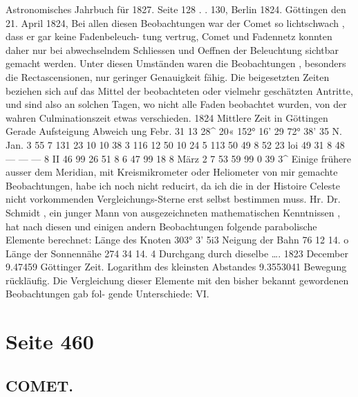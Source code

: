 \documentclass[10pt,a4paper]{article}
\begin{document}
Astronomisches  Jahrbuch  für  1827.     Seite  128  . .  130,     Berlin  1824.
Göttingen  den  21.  April  1824,
Bei  allen  diesen  Beobachtungen  war  der  Comet  so  lichtschwach ,  dass  er  gar  keine  Fadenbeleuch-
tung vertrug,  Comet  und  Fadennetz  konnten  daher  nur  bei  abwechselndem  Schliessen  und  Oeffnen  der
Beleuchtung  sichtbar  gemacht  werden.  Unter  diesen  Umständen  waren  die  Beobachtungen ,  besonders
die  Rectascensionen,  nur  geringer  Genauigkeit  fähig.  Die  beigesetzten  Zeiten  beziehen  sich  auf  das
Mittel  der  beobachteten  oder  vielmehr  geschätzten  Antritte,  und  sind  also  an  solchen  Tagen,  wo  nicht
alle  Faden  beobachtet  wurden,  von  der  wahren  Culminationszeit  etwas  verschieden.
1824
Mittlere  Zeit
in  Göttingen
Gerade
Aufsteigung
Abweich
ung
Febr.   31
13\glqq{}  28\textasciicircum{}\glqq{}  20«
152°  16'    29\glqq{}
72°
38'
35\glqq{}  N.
Jan.       3
\glqq{}     55       7
131     23     10
10     38       3
116     12     50
10     24      5
113     50     49
8     52     23
loi     49     31
8     48
---     ---     ---
8     II     46
99     26     51
8       6     47
99     18       8
März      2
7     53     59
99       0     39
3\textasciicircum{}
Einige  frühere  ausser  dem  Meridian,  mit  Kreismikrometer  oder  Heliometer  von  mir  gemachte
Beobachtungen,  habe  ich  noch  nicht  reducirt,  da  ich  die  in  der  Histoire  Celeste  nicht  vorkommenden
Vergleichungs-Sterne  erst  selbst  bestimmen  muss.
Hr.  Dr.  Schmidt  ,  ein  junger  Mann  von  ausgezeichneten  mathematischen  Kenntnissen ,  hat  nach
diesen  und  einigen  andern  Beobachtungen  folgende  parabolische  Elemente  berechnet:
Länge  des  Knoten    303°     3'    5i\glqq{}3
Neigung  der  Bahn    76     12     14.  o
Länge  der  Sonnennähe    274     34     14. 4
Durchgang  durch  dieselbe  \dots{}.     1823  December  9.47459  Göttinger  Zeit.
Logarithm  des  kleinsten  Abstandes    9.3553041
Bewegung  rückläufig.
Die  Vergleichung  dieser  Elemente  mit  den  bisher  bekannt  gewordenen  Beobachtungen  gab  fol-
gende Unterschiede:
VI.

\newpage
\section*{Seite 460}

\subsection*{COMET.}
\end{document}
